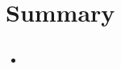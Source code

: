 \documentclass{scrartcl}
\begin{document}
\section{Summary}
\subsection{}
\begin{itemize}
\item
\end{itemize}








%




\end{document}
